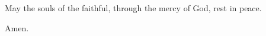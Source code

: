 \noindent \vv May the souls of the faithful, through the mercy of God, rest in peace.

\noindent \rr Amen.